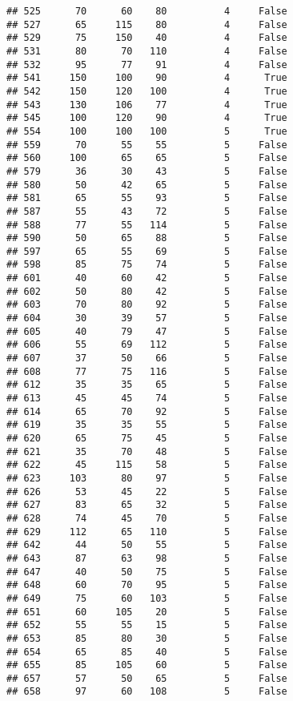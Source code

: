 \documentclass[
]{article}
\begin{document}
\begin{verbatim}
## 525      70      60    80          4     False
## 527      65     115    80          4     False
## 529      75     150    40          4     False
## 531      80      70   110          4     False
## 532      95      77    91          4     False
## 541     150     100    90          4      True
## 542     150     120   100          4      True
## 543     130     106    77          4      True
## 545     100     120    90          4      True
## 554     100     100   100          5      True
## 559      70      55    55          5     False
## 560     100      65    65          5     False
## 579      36      30    43          5     False
## 580      50      42    65          5     False
## 581      65      55    93          5     False
## 587      55      43    72          5     False
## 588      77      55   114          5     False
## 590      50      65    88          5     False
## 597      65      55    69          5     False
## 598      85      75    74          5     False
## 601      40      60    42          5     False
## 602      50      80    42          5     False
## 603      70      80    92          5     False
## 604      30      39    57          5     False
## 605      40      79    47          5     False
## 606      55      69   112          5     False
## 607      37      50    66          5     False
## 608      77      75   116          5     False
## 612      35      35    65          5     False
## 613      45      45    74          5     False
## 614      65      70    92          5     False
## 619      35      35    55          5     False
## 620      65      75    45          5     False
## 621      35      70    48          5     False
## 622      45     115    58          5     False
## 623     103      80    97          5     False
## 626      53      45    22          5     False
## 627      83      65    32          5     False
## 628      74      45    70          5     False
## 629     112      65   110          5     False
## 642      44      50    55          5     False
## 643      87      63    98          5     False
## 647      40      50    75          5     False
## 648      60      70    95          5     False
## 649      75      60   103          5     False
## 651      60     105    20          5     False
## 652      55      55    15          5     False
## 653      85      80    30          5     False
## 654      65      85    40          5     False
## 655      85     105    60          5     False
## 657      57      50    65          5     False
## 658      97      60   108          5     False

\end{verbatim}
\end{document}
